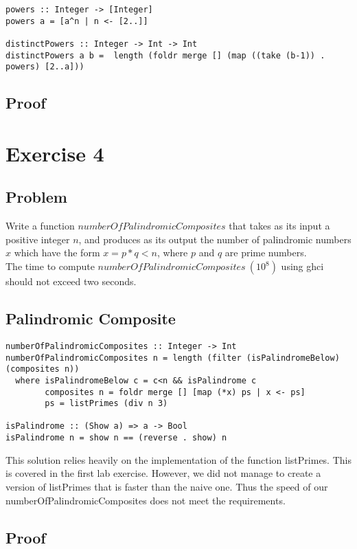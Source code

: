 \documentclass[a4paper,11pt]{article}
\begin{document}
\begin{lstlisting}
powers :: Integer -> [Integer]
powers a = [a^n | n <- [2..]]

distinctPowers :: Integer -> Int -> Int
distinctPowers a b =  length (foldr merge [] (map ((take (b-1)) . powers) [2..a]))
\end{lstlisting}

\subsection{Proof}

\section{Exercise 4}
\subsection{Problem}
Write a function $numberOfPalindromicComposites$ that takes as its input a positive integer $n$, and
produces as its output the number of palindromic numbers $x$ which have the form $x=p*q<n$, where $p$
and $q$ are prime numbers.\\
The time to compute $numberOfPalindromicComposites\: (10^8)$ using ghci should not exceed
two seconds.

\subsection{Palindromic Composite}

\begin{lstlisting}
numberOfPalindromicComposites :: Integer -> Int
numberOfPalindromicComposites n = length (filter (isPalindromeBelow) (composites n))
  where isPalindromeBelow c = c<n && isPalindrome c
        composites n = foldr merge [] [map (*x) ps | x <- ps]
        ps = listPrimes (div n 3)

isPalindrome :: (Show a) => a -> Bool
isPalindrome n = show n == (reverse . show) n
\end{lstlisting}

This solution relies heavily on the implementation of the function listPrimes. This is covered in the first lab exercise. However, we did not manage to create a version of listPrimes that is faster than the naive one. Thus the speed of our numberOfPalindromicComposites does not meet the requirements.

\subsection{Proof}
\end{document}
